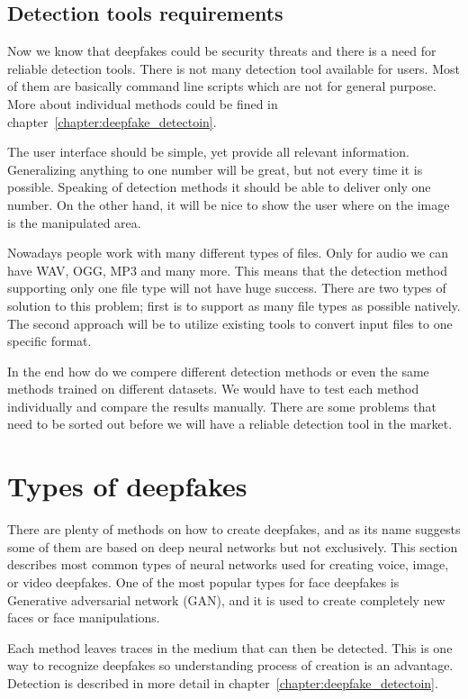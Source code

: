 \section{Detection tools requirements}

Now we know that deepfakes could be security threats and there is a need for reliable detection tools. There is not many detection tool available for users. Most of them are basically command line scripts which are not for general purpose. More about individual methods could be fined in chapter~\ref{chapter:deepfake_detectoin}.

The user interface should be simple, yet provide all relevant information. Generalizing anything to one number will be great, but not every time it is possible. Speaking of detection methods it should be able to deliver only one number. On the other hand, it will be nice to show the user where on the image is the manipulated area. 

Nowadays people work with many different types of files. Only for audio we can have WAV, OGG, MP3 and many more. This means that the detection method supporting only one file type will not have huge success. There are two types of solution to this problem; first is to support as many file types as possible natively. The second approach will be to utilize existing tools to convert input files to one specific format.

In the end how do we compere different detection methods or even the same methods trained on different datasets. We would have to test each method individually and compare the results manually. There are some problems that need to be sorted out before we will have a reliable detection tool in the market. 

\chapter{Types of deepfakes}
\label{chapter:deepfakes_creation}

There are plenty of methods on how to create deepfakes, and as its name suggests some of them are based on deep neural networks but not exclusively. This section describes most common types of neural networks used for creating voice, image, or video deepfakes. One of the most popular types for face deepfakes is Generative adversarial network (GAN), and it is used to create completely new faces or face manipulations.

Each method leaves traces in the medium that can then be detected. This is one way to recognize deepfakes so understanding process of creation is an advantage. Detection is described in more detail in chapter~\ref{chapter:deepfake_detectoin}.

